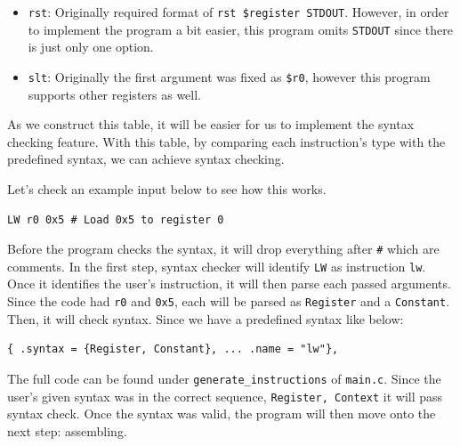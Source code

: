 \documentclass{homework}
\begin{document}
\begin{itemize}
    \item \texttt{rst}: Originally required format of \texttt{rst \$register STDOUT}. However, in order to implement the program a bit easier, this program omits \texttt{STDOUT} since there is just only one option. 
    \item \texttt{slt}: Originally the first argument was fixed as \texttt{\$r0}, however this program supports other registers as well. 
\end{itemize}

As we construct this table, it will be easier for us to implement the syntax checking feature. With this table, by comparing each instruction's type with the predefined syntax, we can achieve syntax checking. 

Let's check an example input below to see how this works.
\\
\begin{center}
\begin{code}
\begin{verbatim}
LW r0 0x5 # Load 0x5 to register 0
\end{verbatim}
\end{code}
\end{center}

Before the program checks the syntax, it will drop everything after \texttt{\#} which are comments. In the first step, syntax checker will identify \texttt{LW} as instruction \texttt{lw}. Once it identifies the user's instruction, it will then parse each passed arguments. Since the code had \texttt{r0} and \texttt{0x5}, each will be parsed as \texttt{Register} and a \texttt{Constant}. Then, it will check syntax. Since we have a predefined syntax like below:
\\
\begin{center}
\begin{code}
\begin{verbatim}
{ .syntax = {Register, Constant}, ... .name = "lw"},
\end{verbatim}
\end{code}
\end{center}

The full code can be found under \texttt{generate_instructions} of \texttt{main.c}. Since the user's given syntax was in the correct sequence, \texttt{Register, Context} it will pass syntax check. Once the syntax was valid, the program will then move onto the next step: assembling.
\end{document}
